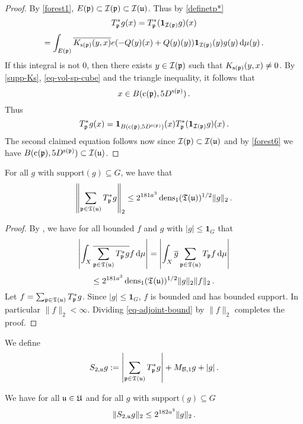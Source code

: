 \begin{proof}
    \leanok
    By \eqref{forest1}, $E({\mathfrak p}) \subset {\mathcal{I}}({\mathfrak p}) \subset {\mathcal{I}}({\mathfrak u})$. Thus by \eqref{definetp*}
    $$
         T_{{\mathfrak p}}^* g(x) = T_{{\mathfrak p}}^* (\mathbf{1}_{{\mathcal{I}}({\mathfrak p})} g)(x)
    $$
    $$
        = \int_{E({\mathfrak p})} \overline{K_{{\mathrm{s}}({\mathfrak p})}(y,x)} e(-{Q}(y)(x) + {Q}(y)(y)) \mathbf{1}_{{\mathcal{I}}({\mathfrak p})}(y) g(y) \, \mathrm{d}\mu(y)\,.
    $$
    If this integral is not $0$, then there exists $y \in {\mathcal{I}}({\mathfrak p})$ such that $K_{{\mathrm{s}}({\mathfrak p})}(y,x) \ne 0$. By \eqref{supp-Ks}, \eqref{eq-vol-sp-cube} and the triangle inequality, it follows that
    \begin{equation*}
        x \in B({\mathrm{c}}({\mathfrak p}), 5 D^{{\mathrm{s}}({\mathfrak p})})\, .
    \end{equation*}
    Thus
    $$
        T_{{\mathfrak p}}^* g(x) = \mathbf{1}_{B({\mathrm{c}}({\mathfrak p}), 5D^{{\mathrm{s}}({\mathfrak p})})}(x) T_{{\mathfrak p}}^* (\mathbf{1}_{{\mathcal{I}}({\mathfrak p})} g)(x)\,.
    $$
    The second claimed equation follows now since ${\mathcal{I}}({\mathfrak p}) \subset {\mathcal{I}}({\mathfrak u})$ and by \eqref{forest6} we have $B({\mathrm{c}}({\mathfrak p}), 5D^{{\mathrm{s}}({\mathfrak p})}) \subset {\mathcal{I}}({\mathfrak u})$.
\end{proof}

\begin{lemma}
    \label{adjoint-tree-estimate}
    \leanok
    For all $g$ with $\text{support}(g) \subseteq G$, we have that
    $$
        \left\| \sum_{{\mathfrak p} \in {\mathfrak T}({\mathfrak u})} T_{{\mathfrak p}}^* g\right\|_2 \le 2^{181a^3} \operatorname{\operatorname{dens}}_1({\mathfrak T}({\mathfrak u}))^{1/2} \|g\|_2\,.
    $$
\end{lemma}

\begin{proof}
    \leanok
    By , we have for all bounded $f$ and $g$ with $|g| \le \mathbf{1}_G$ that
    $$
        \left| \int_X \overline{\sum_{{\mathfrak p}\in {\mathfrak T}({\mathfrak u})} T_{{\mathfrak p}}^* g} f \,\mathrm{d}\mu \right| = \left| \int_X \overline{g} \sum_{{\mathfrak p} \in {\mathfrak T}({\mathfrak u})} T_{{\mathfrak p}} f \,\mathrm{d}\mu \right|
    $$
    \begin{equation}
        \label{eq-adjoint-bound}
        \le 2^{181a^3} \operatorname{\operatorname{dens}}_1({\mathfrak T}({\mathfrak u}))^{1/2} \|g\|_2 \|f\|_2\,.
    \end{equation}
    Let $f = \sum_{{\mathfrak p} \in {\mathfrak T}({\mathfrak u})} T_{{\mathfrak p}}^* g$. Since $|g| \le \mathbf{1}_G$, $f$ is bounded and has bounded support. In particular $\|f\|_2 < \infty$. Dividing \eqref{eq-adjoint-bound} by $\|f\|_2$ completes the proof.
\end{proof}

We define
$$
    S_{2,{\mathfrak u}}g := \left|\sum_{{\mathfrak p} \in {\mathfrak T}({\mathfrak u})} T_{{\mathfrak p}}^*g \right| + M_{\mathcal{B},1}g + |g|\,.
$$
\begin{lemma}
    \label{adjoint-tree-control}
    \leanok
    We have for all ${\mathfrak u} \in {\mathfrak U}$ and for all $g$ with $\text{support}(g) \subseteq G$
    $$
        \|S_{2, {\mathfrak u}} g\|_2 \le 2^{182a^3} \|g\|_2\,.
    $$
\end{lemma}

